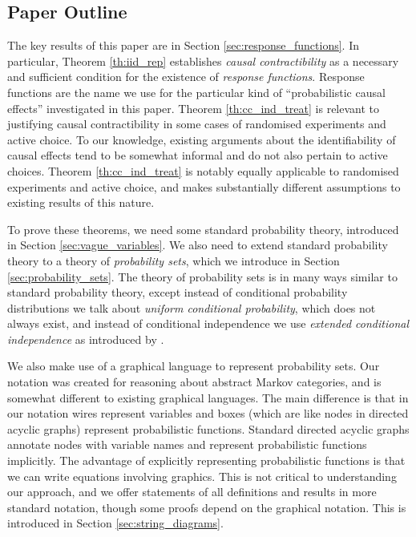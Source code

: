 \documentclass{article}
\theoremstyle{plain}
\theoremstyle{definition}
\begin{document}
\subsection{Paper Outline}

The key results of this paper are in Section \ref{sec:response_functions}. In particular, Theorem \ref{th:iid_rep} establishes \emph{causal contractibility} as a necessary and sufficient condition for the existence of \emph{response functions}. Response functions are the name we use for the particular kind of ``probabilistic causal effects'' investigated in this paper. Theorem \ref{th:cc_ind_treat} is relevant to justifying causal contractibility in some cases of randomised experiments and active choice. To our knowledge, existing arguments about the identifiability of causal effects tend to be somewhat informal and do not also pertain to active choices. Theorem \ref{th:cc_ind_treat} is notably equally applicable to randomised experiments and active choice, and makes substantially different assumptions to existing results of this nature.

To prove these theorems, we need some standard probability theory, introduced in Section \ref{sec:vague_variables}. We also need to extend standard probability theory to a theory of \emph{probability sets}, which we introduce in Section \ref{sec:probability_sets}. The theory of probability sets is in many ways similar to standard probability theory, except instead of conditional probability distributions we talk about \emph{uniform conditional probability}, which does not always exist, and instead of conditional independence we use \emph{extended conditional independence} as introduced by \citet{constantinou_extended_2017}.

We also make use of a graphical language to represent probability sets. Our notation was created for reasoning about abstract Markov categories, and is somewhat different to existing graphical languages. The main difference is that in our notation wires represent variables and boxes (which are like nodes in directed acyclic graphs) represent probabilistic functions. Standard directed acyclic graphs annotate nodes with variable names and represent probabilistic functions implicitly. The advantage of explicitly representing probabilistic functions is that we can write equations involving graphics. This is not critical to understanding our approach, and we offer statements of all definitions and results in more standard notation, though some proofs depend on the graphical notation. This is introduced in Section \ref{sec:string_diagrams}.
\end{document}
